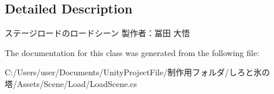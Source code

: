 \subsection{Detailed Description}
ステージロードのロードシーン 製作者：冨田 大悟 



The documentation for this class was generated from the following file\+:\begin{DoxyCompactItemize}
\item 
C\+:/\+Users/user/\+Documents/\+Unity\+Project\+File/制作用フォルダ/しろと氷の塔/\+Assets/\+Scene/\+Load/Load\+Scene.\+cs\end{DoxyCompactItemize}
